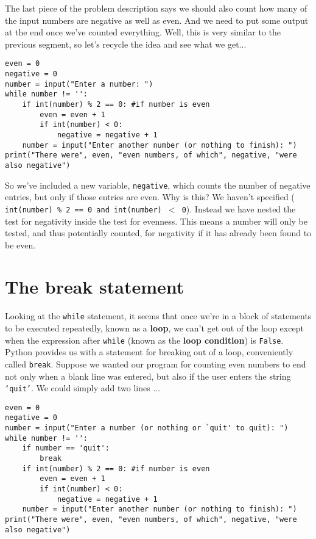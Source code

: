 The last piece of the problem description says we should also count   how many of the input numbers are negative as well as even. And we need   to put some output at the end once we've counted everything. Well, this   is very similar to the previous segment, so let's recycle the idea and   see what we get...
\begin{lstlisting}
even = 0
negative = 0
number = input("Enter a number: ")
while number != '':
    if int(number) % 2 == 0: #if number is even
        even = even + 1
        if int(number) < 0:
            negative = negative + 1
    number = input("Enter another number (or nothing to finish): ")
print("There were", even, "even numbers, of which", negative, "were also negative")
\end{lstlisting}

So we've included a new variable, \texttt{negative}, which counts the   number of negative entries, but only if those entries are even. Why is   this? We haven't specified (
\texttt{int(number) \% 2 == 0 and int(number)   $<$ 0}). Instead we have nested the test for negativity inside   the test for evenness. This means a number will only be tested, and   thus potentially counted, for negativity if it has already been found   to be even.

\section{The break statement}

Looking at the \texttt{while} statement, it seems that once we're in a block   of statements to be executed repeatedly, known as a   \textbf{loop}, we can't get out of the loop except when the   expression after \texttt{while} (known as the \textbf{loop condition}) is \texttt{False}.   Python provides us with a statement for breaking out of a loop,   conveniently called \texttt{break}. Suppose we   wanted our program for counting even numbers to end not only when a   blank line was entered, but also if the user enters the string \texttt{`quit'}.   We could simply add two lines ...
\begin{lstlisting}
even = 0
negative = 0
number = input("Enter a number (or nothing or `quit' to quit): ")
while number != '':
    if number == 'quit':
        break
    if int(number) % 2 == 0: #if number is even
        even = even + 1
        if int(number) < 0:
            negative = negative + 1
    number = input("Enter another number (or nothing to finish): ")
print("There were", even, "even numbers, of which", negative, "were also negative")
\end{lstlisting}

